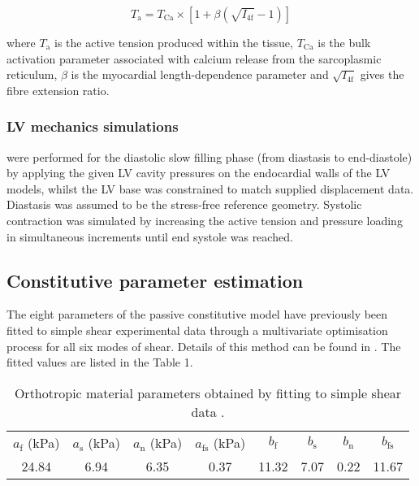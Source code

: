 \documentclass{llncs}
\begin{document}
\begin{equation}
T_{\mathrm{a}}=T_{\mathrm{Ca}}\times[1+\beta(\sqrt{I_{4\mathrm{f}}}-1)]
\end{equation}

where $T_{\mathrm{a}}$ is the active tension produced within the tissue, $T_{\mathrm{Ca}}$ is the bulk activation parameter associated with calcium release from the sarcoplasmic reticulum, $\beta$ is the myocardial length-dependence parameter and $\sqrt{I_{4\mathrm{f}}}$ gives the fibre extension ratio. 

\subsubsection{LV mechanics simulations} were performed for the diastolic slow filling phase (from diastasis to end-diastole) by applying the given LV cavity pressures on the endocardial walls of the LV models, whilst the LV base was constrained to match supplied displacement data. Diastasis was assumed to be the stress-free reference geometry. Systolic contraction was simulated by increasing the active tension and pressure loading in simultaneous increments until end systole was reached.  

\subsection{Constitutive parameter estimation}

The eight parameters of the passive constitutive model have previously been fitted to simple shear experimental data \cite{Dokos} through a multivariate optimisation process for all six modes of shear. Details of this method can be found in \cite{Justyna}. The fitted values are listed in the Table 1.

\begin{table}[H]
	\caption{Orthotropic material parameters obtained by fitting to simple shear data \cite{Dokos}. }
	\begin{center}
		\renewcommand{\arraystretch}{1.2}
		\setlength\tabcolsep{8pt}
		\begin{tabular}{cccccccc}
		\hline\noalign{\smallskip}
		$a_{\mathrm{f}}$ (kPa) & $a_{\mathrm{s}}$ (kPa) & $a_{\mathrm{n}}$ (kPa) & $a_{\mathrm{fs}}$ (kPa) & $b_{\mathrm{f}}$ & $b_{\mathrm{s}}$ & $b_{\mathrm{n}}$ & $b_{\mathrm{fs}}$\\
		\noalign{\smallskip}
		\hline
		\noalign{\smallskip}
		24.84&6.94&6.35&0.37&11.32&7.07&0.22&11.67\\
		\hline
		\end{tabular}
	\end{center}
\end{table}
\end{document}
